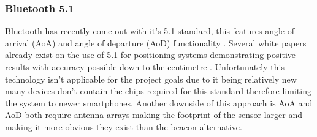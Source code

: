 \subsubsection{Bluetooth 5.1}
Bluetooth has recently come out with it’s 5.1 standard, this features angle of arrival (AoA) and angle of departure (AoD) functionality \citetemp. Several white papers already exist on the use of 5.1 for positioning systems demonstrating positive results with accuracy possible down to the centimetre \citetemp. Unfortunately this technology isn't applicable for the project goals due to it being relatively new many devices don't contain the chips required for this standard therefore limiting the system to newer smartphones. Another downside of this approach is AoA and AoD both require antenna arrays making the footprint of the sensor larger and making it more obvious they exist than the beacon alternative.
